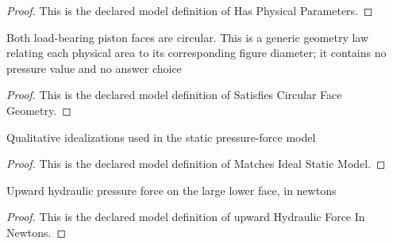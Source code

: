 \begin{proof}
  This is the declared model definition of Has Physical Parameters.
\end{proof}
\begin{definition}
  \label{def:physics:phyx-mini-0395:phyxminiproblems-problemphyxmini0395-satisfiescircularfacegeometry}
  Both load-bearing piston faces are circular. This is a generic geometry law relating each physical area to its corresponding figure diameter; it contains no pressure value and no answer choice
\end{definition}
\begin{proof}
  This is the declared model definition of Satisfies Circular Face Geometry.
\end{proof}
\begin{definition}
  \label{def:physics:phyx-mini-0395:phyxminiproblems-problemphyxmini0395-matchesidealstaticmodel}
  Qualitative idealizations used in the static pressure-force model
\end{definition}
\begin{proof}
  This is the declared model definition of Matches Ideal Static Model.
\end{proof}
\begin{definition}
  \label{def:physics:phyx-mini-0395:phyxminiproblems-problemphyxmini0395-upwardhydraulicforceinnewtons}
  Upward hydraulic pressure force on the large lower face, in newtons
\end{definition}
\begin{proof}
  This is the declared model definition of upward Hydraulic Force In Newtons.
\end{proof}
